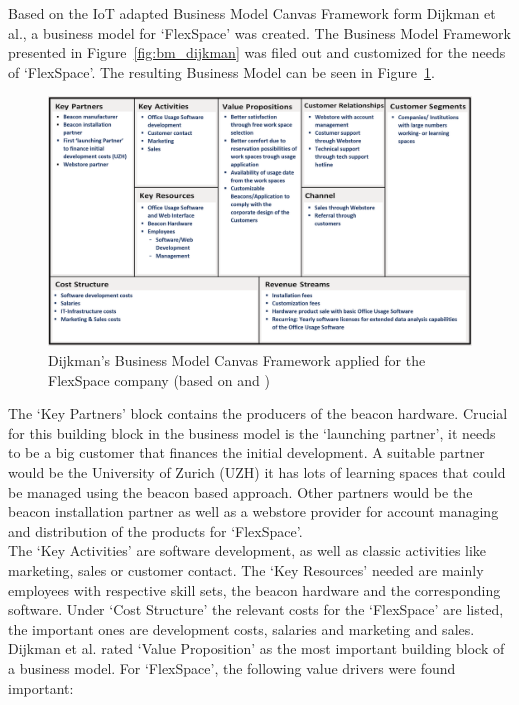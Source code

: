 	Based on the IoT adapted Business Model Canvas Framework form Dijkman et al., a business model for `FlexSpace' was created. The Business Model Framework presented in Figure~\ref{fig:bm_dijkman} was filed out and customized for the needs of `FlexSpace'. The resulting Business Model can be seen in Figure~\ref{fig:bmc_flex}.

			\begin{figure}[ht]
			    \begin{center}
			    \includegraphics[scale=0.35]{Talk11/bmc_flex.png}
			    \end{center}
			    \caption{Dijkman's Business Model Canvas Framework applied for the FlexSpace company (based on \cite{dijkman} and \cite{bmc})}
			    \label{fig:bmc_flex}
			\end{figure}
	The `Key Partners' block contains the producers of the beacon hardware. Crucial for this building block in the business model is the `launching partner', it needs to be a big customer that finances the initial development. A suitable partner would be the University of Zurich (UZH) it has lots of learning spaces that could be managed using the beacon based approach. Other partners would be the beacon installation partner as well as a webstore provider for account managing and distribution of the products for `FlexSpace'.\\
	The `Key Activities' are software development, as well as classic activities like marketing, sales or customer contact. The `Key Resources' needed are mainly employees with respective skill sets, the beacon hardware and the corresponding software. Under `Cost Structure' the relevant costs for the `FlexSpace' are listed, the important ones are development costs, salaries and marketing and sales.\\
	Dijkman et al. \cite{dijkman}  rated `Value Proposition' as the most important building block of a business model. For `FlexSpace', the following value drivers were found important:

